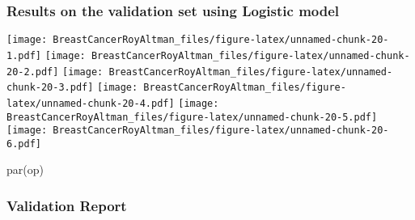 \documentclass[
]{article}
\newenvironment{Shaded}{\begin{snugshade}}{\end{snugshade}}
\newcommand{\AttributeTok}[1]{\textcolor[rgb]{0.77,0.63,0.00}{#1}}
\newcommand{\DecValTok}[1]{\textcolor[rgb]{0.00,0.00,0.81}{#1}}
\newcommand{\FloatTok}[1]{\textcolor[rgb]{0.00,0.00,0.81}{#1}}
\newcommand{\FunctionTok}[1]{\textcolor[rgb]{0.00,0.00,0.00}{#1}}
\newcommand{\NormalTok}[1]{#1}
\newcommand{\OtherTok}[1]{\textcolor[rgb]{0.56,0.35,0.01}{#1}}
\newcommand{\SpecialCharTok}[1]{\textcolor[rgb]{0.00,0.00,0.00}{#1}}
\newcommand{\StringTok}[1]{\textcolor[rgb]{0.31,0.60,0.02}{#1}}
\begin{document}
\hypertarget{results-on-the-validation-set-using-logistic-model}{%
\subsubsection{Results on the validation set using Logistic
model}\label{results-on-the-validation-set-using-logistic-model}}

\begin{Shaded}
\end{Shaded}

\texttt{[image: BreastCancerRoyAltman\_files/figure-latex/unnamed-chunk-20-1.pdf]}
\texttt{[image: BreastCancerRoyAltman\_files/figure-latex/unnamed-chunk-20-2.pdf]}
\texttt{[image: BreastCancerRoyAltman\_files/figure-latex/unnamed-chunk-20-3.pdf]}
\texttt{[image: BreastCancerRoyAltman\_files/figure-latex/unnamed-chunk-20-4.pdf]}
\texttt{[image: BreastCancerRoyAltman\_files/figure-latex/unnamed-chunk-20-5.pdf]}
\texttt{[image: BreastCancerRoyAltman\_files/figure-latex/unnamed-chunk-20-6.pdf]}

\begin{Shaded}
\begin{Highlighting}[]
\FunctionTok{par}\NormalTok{(op)}
\end{Highlighting}
\end{Shaded}

\hypertarget{validation-report}{%
\subsubsection{Validation Report}\label{validation-report}}
\end{document}
